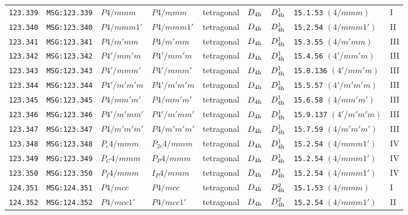 \documentclass[fleqn,10pt]{jsarticle}
\begin{document}
\begin{center}
\begin{longtable}{lllllllll}
\texttt{123.339} & \texttt{MSG:123.339} & $P4/mmm$ & $P4/mmm$ & tetragonal & $D_{\rm 4h}$ & $D_{\rm 4h}^{1}$ & \texttt{15.1.53} $(4/mmm)$ & I \\
\texttt{123.340} & \texttt{MSG:123.340} & $P4/mmm1'$ & $P4/mmm1'$ & tetragonal & $D_{\rm 4h}$ & $D_{\rm 4h}^{1}$ & \texttt{15.2.54} $(4/mmm1')$ & II \\
\texttt{123.341} & \texttt{MSG:123.341} & $P4/m'mm$ & $P4/m'mm$ & tetragonal & $D_{\rm 4h}$ & $D_{\rm 4h}^{1}$ & \texttt{15.3.55} $(4/m'mm)$ & III \\
\texttt{123.342} & \texttt{MSG:123.342} & $P4'/mm'm$ & $P4'/mm'm$ & tetragonal & $D_{\rm 4h}$ & $D_{\rm 4h}^{1}$ & \texttt{15.4.56} $(4'/mm'm)$ & III \\
\texttt{123.343} & \texttt{MSG:123.343} & $P4'/mmm'$ & $P4'/mmm'$ & tetragonal & $D_{\rm 4h}$ & $D_{\rm 4h}^{1}$ & \texttt{15.8.136} $(4'/mm'm)$ & III \\
\texttt{123.344} & \texttt{MSG:123.344} & $P4'/m'm'm$ & $P4'/m'm'm$ & tetragonal & $D_{\rm 4h}$ & $D_{\rm 4h}^{1}$ & \texttt{15.5.57} $(4'/m'm'm)$ & III \\
\texttt{123.345} & \texttt{MSG:123.345} & $P4/mm'm'$ & $P4/mm'm'$ & tetragonal & $D_{\rm 4h}$ & $D_{\rm 4h}^{1}$ & \texttt{15.6.58} $(4/mm'm')$ & III \\
\texttt{123.346} & \texttt{MSG:123.346} & $P4'/m'mm'$ & $P4'/m'mm'$ & tetragonal & $D_{\rm 4h}$ & $D_{\rm 4h}^{1}$ & \texttt{15.9.137} $(4'/m'm'm)$ & III \\
\texttt{123.347} & \texttt{MSG:123.347} & $P4/m'm'm'$ & $P4/m'm'm'$ & tetragonal & $D_{\rm 4h}$ & $D_{\rm 4h}^{1}$ & \texttt{15.7.59} $(4/m'm'm')$ & III \\
\texttt{123.348} & \texttt{MSG:123.348} & $P_{c}4/mmm$ & $P_{2c}4/mmm$ & tetragonal & $D_{\rm 4h}$ & $D_{\rm 4h}^{1}$ & \texttt{15.2.54} $(4/mmm1')$ & IV \\
\texttt{123.349} & \texttt{MSG:123.349} & $P_{C}4/mmm$ & $P_{P}4/mmm$ & tetragonal & $D_{\rm 4h}$ & $D_{\rm 4h}^{1}$ & \texttt{15.2.54} $(4/mmm1')$ & IV \\
\texttt{123.350} & \texttt{MSG:123.350} & $P_{I}4/mmm$ & $I_{P}4/mmm$ & tetragonal & $D_{\rm 4h}$ & $D_{\rm 4h}^{1}$ & \texttt{15.2.54} $(4/mmm1')$ & IV \\ \hline
\texttt{124.351} & \texttt{MSG:124.351} & $P4/mcc$ & $P4/mcc$ & tetragonal & $D_{\rm 4h}$ & $D_{\rm 4h}^{2}$ & \texttt{15.1.53} $(4/mmm)$ & I \\
\texttt{124.352} & \texttt{MSG:124.352} & $P4/mcc1'$ & $P4/mcc1'$ & tetragonal & $D_{\rm 4h}$ & $D_{\rm 4h}^{2}$ & \texttt{15.2.54} $(4/mmm1')$ & II \\

\end{longtable}
\end{center}
\end{document}
